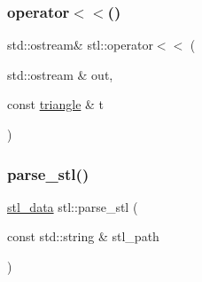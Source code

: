\subsubsection{\texorpdfstring{operator$<$$<$()}{operator<<()}}
{\footnotesize\ttfamily std\+::ostream\& stl\+::operator$<$$<$ (\begin{DoxyParamCaption}\item[{std\+::ostream \&}]{out,  }\item[{const \mbox{\hyperlink{structstl_1_1triangle}{triangle}} \&}]{t }\end{DoxyParamCaption})}

\mbox{\label{namespacestl_ad322d44b1c95c5975c33f9a5abe8df9d}} 
\subsubsection{\texorpdfstring{parse\+\_\+stl()}{parse\_stl()}}
{\footnotesize\ttfamily \mbox{\hyperlink{structstl_1_1stl__data}{stl\+\_\+data}} stl\+::parse\+\_\+stl (\begin{DoxyParamCaption}\item[{const std\+::string \&}]{stl\+\_\+path }\end{DoxyParamCaption})}

